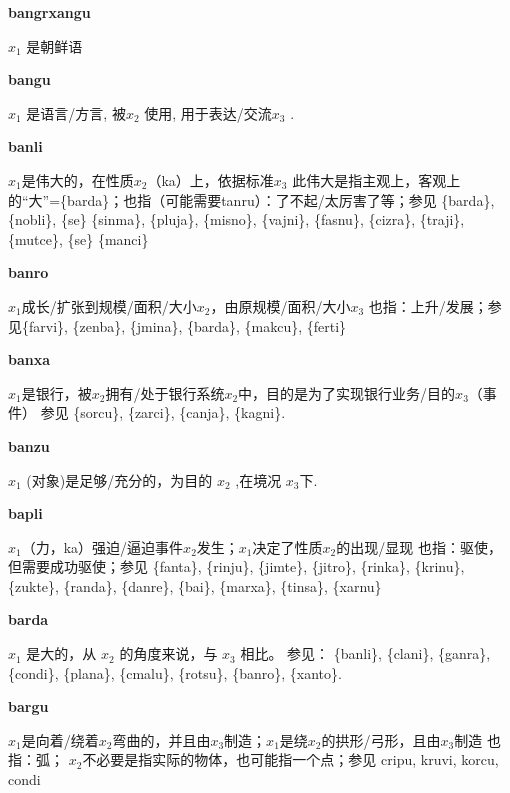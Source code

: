 \documentclass[notitlepage,twocolumn,a4paper,10pt]{book}
\begin{document}
{\sffamily\bfseries bangrxangu} $x_1$ 是朝鲜语

{\sffamily\bfseries bangu}  $x_1$ 是语言\slash{}方言, 被$x_2$ 使用, 用于表达\slash{}交流$x_3$ .

{\sffamily\bfseries banli}\enspace {\ttfamily\bfseries[bal     ba'i]}  $x_1$是伟大的，在性质$x_2$（ka）上，依据标准$x_3$ \textemdash{} 此伟大是指主观上，客观上的“大”=\{barda\}；也指（可能需要tanru）：了不起\slash{}太厉害了等；参见 \{barda\}, \{nobli\}, \{se\} \{sinma\}, \{pluja\}, \{misno\}, \{vajni\}, \{fasnu\}, \{cizra\}, \{traji\}, \{mutce\}, \{se\} \{manci\}

{\sffamily\bfseries banro}\enspace {\ttfamily\bfseries[        ba'o]}  $x_1$成长\slash{}扩张到规模\slash{}面积\slash{}大小$x_2$，由原规模\slash{}面积\slash{}大小$x_3$ \textemdash{} 也指：上升\slash{}发展；参见\{farvi\}, \{zenba\}, \{jmina\}, \{barda\}, \{makcu\}, \{ferti\}

{\sffamily\bfseries banxa}\enspace {\ttfamily\bfseries[bax]}  $x_1$是银行，被$x_2$拥有\slash{}处于银行系统$x_2$中，目的是为了实现银行业务\slash{}目的$x_3$（事件） \textemdash{} 参见 \{sorcu\}, \{zarci\}, \{canja\}, \{kagni\}.

{\sffamily\bfseries banzu}\enspace {\ttfamily\bfseries[baz]}  $x_1$ (对象)是足够\slash{}充分的，为目的 $x_2$ ,在境况 $x_3$下.

{\sffamily\bfseries bapli}  $x_1$（力，ka）强迫\slash{}逼迫事件$x_2$发生；$x_1$决定了性质$x_2$的出现\slash{}显现 \textemdash{} 也指：驱使，但需要成功驱使；参见 \{fanta\}, \{rinju\}, \{jimte\}, \{jitro\}, \{rinka\}, \{krinu\}, \{zukte\}, \{randa\}, \{danre\}, \{bai\}, \{marxa\}, \{tinsa\}, \{xarnu\}

{\sffamily\bfseries barda}\enspace {\ttfamily\bfseries[    bra]}  $x_{1}$ 是大的，从 $x_{2}$ 的角度来说，与 $x_{3}$ 相比。 \textemdash{} 参见： \{banli\}, \{clani\}, \{ganra\}, \{condi\}, \{plana\}, \{cmalu\}, \{rotsu\}, \{banro\}, \{xanto\}.

{\sffamily\bfseries bargu}\enspace {\ttfamily\bfseries[bag]}  $x_1$是向着\slash{}绕着$x_2$弯曲的，并且由$x_3$制造；$x_1$是绕$x_2$的拱形\slash{}弓形，且由$x_3$制造 \textemdash{} 也指：弧； $x_2$不必要是指实际的物体，也可能指一个点；参见 {cripu}, {kruvi}, {korcu}, {condi}
\end{document}
